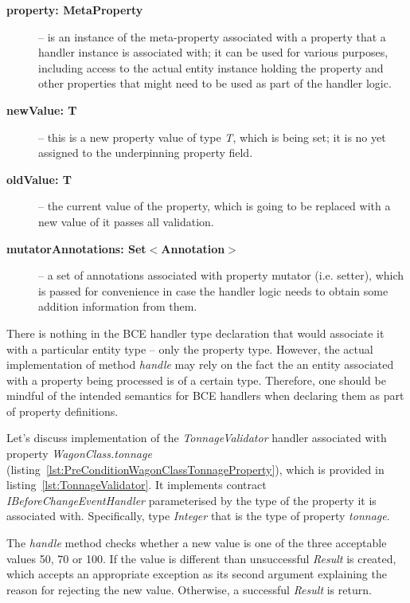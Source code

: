   \begin{description}
    \item[\textbf{property: MetaProperty}] -- is an instance of the meta-property associated with a property that a handler instance is associated with; it can be used for various purposes, including access to the actual entity instance holding the property and other properties that might need to be used as part of the handler logic.
    \item[\textbf{newValue: T}] -- this is a new property value of type \emph{T}, which is being set; it is no yet assigned to the underpinning property field.
    \item[\textbf{oldValue: T}] -- the current value of the property, which is going to be replaced with a new value of it passes all validation.
    \item[\textbf{mutatorAnnotations: Set$<$Annotation$>$}] -- a set of annotations associated with property mutator (i.e. setter), which is passed for convenience in case the handler logic needs to obtain some addition information from them.
   \end{description}
  
  There is nothing in the BCE handler type declaration that would associate it with a particular entity type -- only the property type.
  However, the actual implementation of method \emph{handle} may rely on the fact the an entity associated with a property being processed is of a certain type.
  Therefore, one should be mindful of the intended semantics for BCE handlers when declaring them as part of property definitions.

  Let's discuss implementation of the \emph{TonnageValidator} handler associated with property \emph{WagonClass.tonnage} (listing~\ref{lst:PreConditionWagonClassTonnageProperty}), which is provided in listing~\ref{lst:TonnageValidator}.
  It implements contract \emph{IBeforeChangeEventHandler} parameterised by the type of the property it is associated with.
  Specifically, type \emph{Integer} that is the type of property \emph{tonnage}.
  
  The \emph{handle} method checks whether a new value is one of the three acceptable values 50, 70 or 100.
  If the value is different than unsuccessful \emph{Result} is created, which accepts an appropriate exception as its second argument explaining the reason for rejecting the new value.
  Otherwise, a successful \emph{Result} is return.

